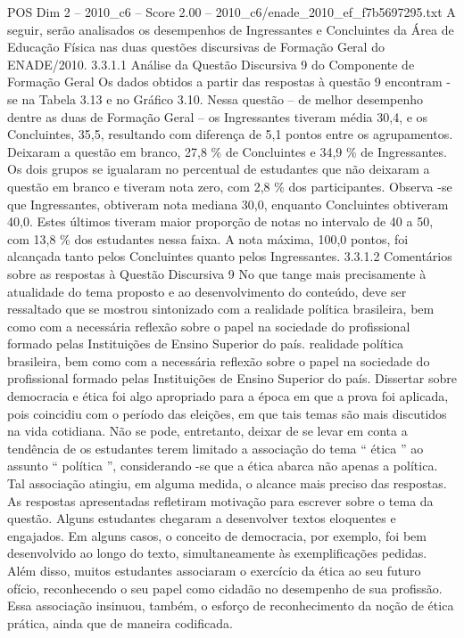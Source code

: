 \begin{textsample}{POS Dim 2 – 2010\_c6 – Score 2.00 – 2010\_c6/enade\_2010\_ef\_f7b5697295.txt}
A seguir, serão analisados os desempenhos de Ingressantes e Concluintes da Área de Educação Física nas duas questões discursivas de Formação Geral do ENADE/2010. 3.3.1.1 Análise da Questão Discursiva 9 do Componente de Formação Geral Os dados obtidos a partir das respostas à questão 9 encontram -se na Tabela 3.13 e no Gráfico 3.10.
Nessa questão – de melhor desempenho dentre as duas de Formação Geral – os Ingressantes tiveram média 30,4, e os Concluintes, 35,5, resultando com diferença de 5,1 pontos entre os agrupamentos.
Deixaram a questão em branco, 27,8 \% de Concluintes e 34,9 \% de Ingressantes.
Os dois grupos se igualaram no percentual de estudantes que não deixaram a questão em branco e tiveram nota zero, com 2,8 \% dos participantes.
Observa -se que Ingressantes, obtiveram nota mediana 30,0, enquanto Concluintes obtiveram 40,0.
Estes últimos tiveram maior proporção de notas no intervalo de 40 a 50, com 13,8 \% dos estudantes nessa faixa.
A nota máxima, 100,0 pontos, foi alcançada tanto pelos Concluintes quanto pelos Ingressantes. 3.3.1.2 Comentários sobre as respostas à Questão Discursiva 9 No que tange mais precisamente à atualidade do tema proposto e ao desenvolvimento do conteúdo, deve ser ressaltado que se mostrou sintonizado com a realidade política brasileira, bem como com a necessária reflexão sobre o papel na sociedade do profissional formado pelas Instituições de Ensino Superior do país. realidade política brasileira, bem como com a necessária reflexão sobre o papel na sociedade do profissional formado pelas Instituições de Ensino Superior do país.
Dissertar sobre democracia e ética foi algo apropriado para a época em que a prova foi aplicada, pois coincidiu com o período das eleições, em que tais temas são mais discutidos na vida cotidiana.
Não se pode, entretanto, deixar de se levar em conta a tendência de os estudantes terem limitado a associação do tema “ ética ” ao assunto “ política ”, considerando -se que a ética abarca não apenas a política.
Tal associação atingiu, em alguma medida, o alcance mais preciso das respostas.
As respostas apresentadas refletiram motivação para escrever sobre o tema da questão.
Alguns estudantes chegaram a desenvolver textos eloquentes e engajados.
Em alguns casos, o conceito de democracia, por exemplo, foi bem desenvolvido ao longo do texto, simultaneamente às exemplificações pedidas.
Além disso, muitos estudantes associaram o exercício da ética ao seu futuro ofício, reconhecendo o seu papel como cidadão no desempenho de sua profissão.
Essa associação insinuou, também, o esforço de reconhecimento da noção de ética prática, ainda que de maneira codificada.

\end{textsample}
